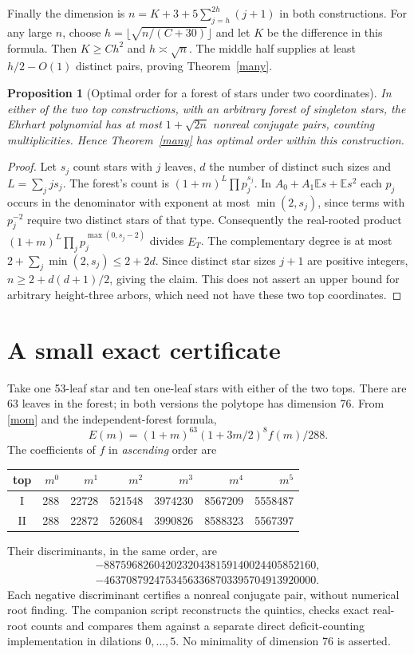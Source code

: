 \documentclass[11pt]{article}
\newtheorem{prop}[thm]{Proposition}
\newcommand{\E}{\mathbb E}
\begin{document}
Finally the dimension is $n=K+3+5\sum_{j=h}^{2h}(j+1)$ in both
constructions. For any large $n$, choose
$h=\lfloor\sqrt{n/(C+30)}\rfloor$ and let $K$ be the difference in this
formula. Then $K\ge Ch^2$ and $h\asymp\sqrt n$. The middle half supplies
at least $h/2-O(1)$ distinct pairs, proving Theorem~\ref{many}.

\begin{prop}[Optimal order for a forest of stars under two coordinates]
In either of the two top constructions, with an arbitrary forest of
singleton stars, the Ehrhart polynomial has at most
$1+\sqrt{2n}$ nonreal conjugate pairs, counting multiplicities.
Hence Theorem~\ref{many} has optimal order within this construction.
\end{prop}
\begin{proof}
Let $s_j$ count stars with $j$ leaves, $d$ the number of distinct such
sizes and $L=\sum_j js_j$. The forest's count is
$(1+m)^L\prod p_j^{s_j}$. In
$A_0+A_1\E s+\E s^2$ each $p_j$ occurs in the denominator with exponent
at most $\min(2,s_j)$, since terms with $p_j^{-2}$ require two distinct
stars of that type. Consequently the real-rooted product
$(1+m)^L\prod_j p_j^{\max(0,s_j-2)}$ divides $E_T$. The complementary
degree is at most $2+\sum_j\min(2,s_j)\le2+2d$. Since distinct star
sizes $j+1$ are positive integers, $n\ge 2+d(d+1)/2$, giving the
claim. This does not assert an upper bound for arbitrary height-three
arbors, which need not have these two top coordinates.
\end{proof}

\section{A small exact certificate}
Take one 53-leaf star and ten one-leaf stars with either of the two tops.
There are 63 leaves in the forest; in both versions the polytope has
dimension 76. From \eqref{mom} and the independent-forest formula,
\[
 E(m)=(1+m)^{63}(1+3m/2)^8 f(m)/288.
\]
The coefficients of $f$ in \emph{ascending} order are
\begin{center}\small\begin{tabular}{crrrrrr}\toprule
top & $m^0$ & $m^1$ & $m^2$ & $m^3$ & $m^4$ & $m^5$\\\midrule
I & 288&22728&521548&3974230&8567209&5558487\\
II &288&22872&526084&3990826&8588323&5567397\\\bottomrule
\end{tabular}\end{center}
Their discriminants, in the same order, are
\begin{gather*}
-88759682604202320438159140024405852160,\\
-46370879247534563368703395704913920000.
\end{gather*}
Each negative discriminant
certifies a nonreal conjugate pair, without numerical root finding. The
companion script reconstructs the quintics, checks exact real-root counts
and compares them against a separate direct deficit-counting implementation
in dilations $0,\ldots,5$. No minimality of dimension 76 is asserted.
\end{document}
